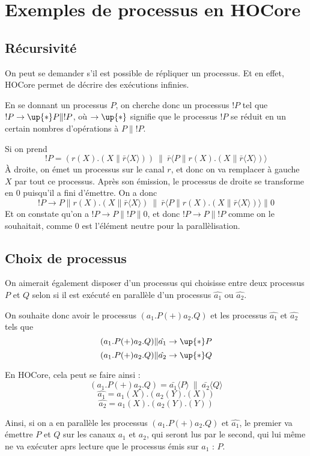 \documentclass{article}
\def\+{(+)} %
\begin{document}
\section{Exemples de processus en HOCore}
\subsection{Récursivité}

On peut se demander s'il est possible de répliquer un processus. Et en effet, HOCore permet de décrire des exécutions infinies.

En se donnant un processus $P$, on cherche donc un processus $!P$ tel que $!P\rightarrow\up{*}P\|!P$, où $\rightarrow\up{*}$ signifie que le processus $!P$ se réduit en un certain nombres d'opérations à $P\|!P$.

Si on prend $$!P = (r(X).(X\|\bar{r}\langle X\rangle))\ \|\ \bar{r}\langle P\|r(X).(X\|\bar{r}\langle X\rangle)\rangle$$
À droite, on émet un processus sur le canal $r$, et donc on va remplacer à gauche $X$ par tout ce processus. Après son émission, le processus de droite se transforme en $0$ puisqu'il a fini d'émettre.
On a donc $$!P\rightarrow P\|r(X).(X\|\bar{r}\langle X\rangle)\ \|\ \bar{r}\langle P\|r(X).(X\|\bar{r}\langle X\rangle)\rangle\| 0$$
Et on constate qu'on a $!P\rightarrow P\|!P\|0$, et donc $!P\rightarrow P\|!P$ comme on le souhaitait, comme $0$ est l'élément neutre pour la parallèlisation.

\subsection{Choix de processus}
On aimerait également disposer d'un processus qui choisisse entre deux processus $P$ et $Q$ selon si il est exécuté en parallèle d'un processus $\hat{a_1}$ ou $\hat{a_2}$.

On souhaite donc avoir le processus $(a_1.P\+ a_2.Q)$ et les processus $\hat{a_1}$ et $\hat{a_2}$ tels que
$$(a_1.P\+ a_2.Q)\|\hat{a_1}\rightarrow\up{*}P$$
$$(a_1.P\+ a_2.Q)\|\hat{a_2}\rightarrow\up{*}Q$$

En HOCore, cela peut se faire ainsi :
$$(a_1.P\+ a_2.Q) = \bar{a_1}\langle P\rangle\ \|\ \bar{a_2}\langle Q\rangle$$
$$\hat{a_1} = a_1(X).(a_2(Y).(X))$$
$$\hat{a_2} = a_1(X).(a_2(Y).(Y))$$

Ainsi, si on a en parallèle les processus $(a_1.P\+ a_2.Q)$ et  $\hat{a_1}$, le premier va émettre $P$ et $Q$ sur les canaux $a_1$ et $a_2$, qui seront lus par le second, qui lui même ne va exécuter aprs lecture que le processus émis sur $a_1$ : $P$. %
\end{document}

